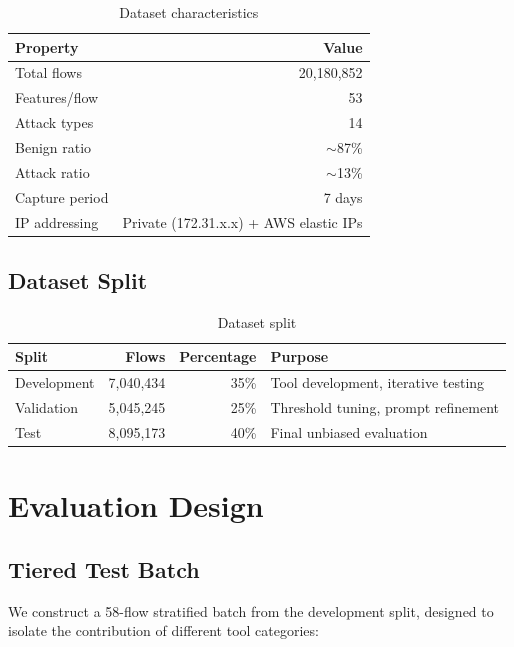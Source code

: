 \documentclass[12pt, a4paper, oneside]{report}
\begin{document}
\begin{table}[H]
\centering
\caption{Dataset characteristics}
\label{tab:dataset}
\begin{tabular}{@{}lr@{}}
\toprule
\textbf{Property} & \textbf{Value} \\
\midrule
Total flows     & 20{,}180{,}852 \\
Features/flow   & 53 \\
Attack types    & 14 \\
Benign ratio    & $\sim$87\% \\
Attack ratio    & $\sim$13\% \\
Capture period  & 7 days \\
IP addressing   & Private (172.31.x.x) + AWS elastic IPs \\
\bottomrule
\end{tabular}
\end{table}

\subsection{Dataset Split}

\begin{table}[H]
\centering
\caption{Dataset split}
\label{tab:split}
\begin{tabular}{@{}lrrl@{}}
\toprule
\textbf{Split} & \textbf{Flows} & \textbf{Percentage} & \textbf{Purpose} \\
\midrule
Development & 7{,}040{,}434 & 35\% & Tool development, iterative testing \\
Validation  & 5{,}045{,}245 & 25\% & Threshold tuning, prompt refinement \\
Test        & 8{,}095{,}173 & 40\% & Final unbiased evaluation \\
\bottomrule
\end{tabular}
\end{table}


\section{Evaluation Design}
\label{sec:eval-design}

\subsection{Tiered Test Batch}

We construct a 58-flow stratified batch from the development split, designed
to isolate the contribution of different tool categories:
\end{document}

